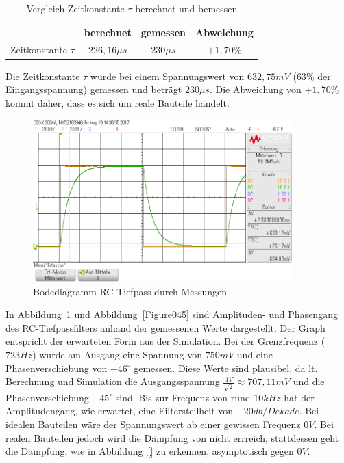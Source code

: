 \documentclass[12pt,a4paper,titlepage]{article}
\begin{document}
\begin{table}[H]
  \centering
  \begin{tabular}{|c|c|c|c|}
  \hline
                     & berechnet    & gemessen    & Abweichung \\ \hline
  Zeitkonstante $\tau$ & $226,16 \mu s$    & $230 \mu s$      & $+1,70 \%$ \\ \hline
  \end{tabular}
  \caption{Vergleich Zeitkonstante $\tau$ berechnet und bemessen}
  \label{Figure03}
\end{table}
\noindent Die Zeitkonstante $\tau$ wurde bei einem Spannungswert von $632,75 mV$ ($63 \%$ der Eingangsspannung) gemessen und betr\"agt $230 \mu s$. Die Abweichung von $+1,70 \%$ kommt daher, dass es sich um reale Bauteile handelt.

\begin{figure}[H]
  \centering
  \includegraphics[width=100mm]{sprungantwort_rc_tiefpass.png}
  \caption{Bodediagramm RC-Tiefpass durch Messungen}
  \label{Figure04}
\end{figure}
In Abbildung~\ref{Figure04} und Abbildung~\ref{Figure045} sind Amplituden- und Phasengang des RC-Tiefpassfilters anhand der gemessenen Werte dargestellt. Der Graph entspricht der erwarteten Form aus der Simulation. Bei der Grenzfrequenz ($723Hz$) wurde am Ausgang eine Spannung von $750mV$ und eine Phasenverschiebung von $-46^{\circ}$ gemessen. Diese Werte sind plausibel, da lt. Berechnung und Simulation die Ausgangsspannung $\frac{1V}{\sqrt{2}} \approx 707,11mV$ und die Phasenverschiebung $-45^{\circ}$ sind. Bis zur Frequenz von rund $10kHz$ hat der Amplitudengang, wie erwartet, eine Filtersteilheit von $-20db/Dekade$. Bei idealen Bauteilen w\"are der Spannungswert ab einer gewissen Frequenz $0 V$. Bei realen Bauteilen jedoch wird die D\"ampfung von nicht errreich, stattdessen geht die D\"ampfung, wie in Abbildung~\ref{} zu erkennen, asymptotisch gegen $0V$.
\end{document}
